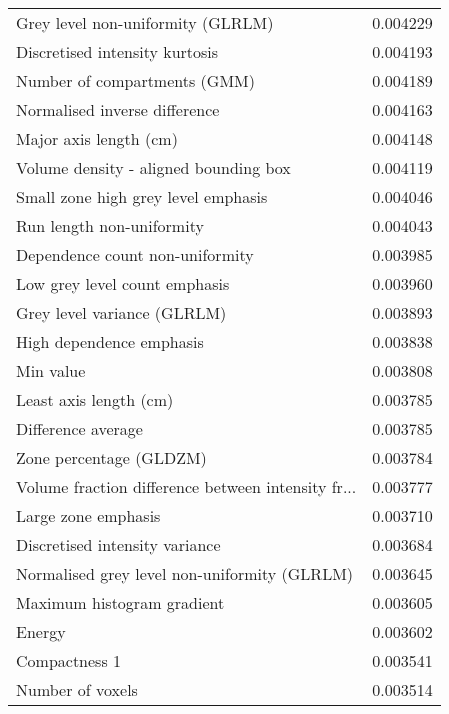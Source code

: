 \begin{longtable}{|lr|}
Grey level non-uniformity (GLRLM)                  &        0.004229 \\
Discretised intensity kurtosis                     &        0.004193 \\
Number of compartments (GMM)                       &        0.004189 \\
Normalised inverse difference                      &        0.004163 \\
Major axis length (cm)                             &        0.004148 \\
Volume density - aligned bounding box              &        0.004119 \\
Small zone high grey level emphasis                &        0.004046 \\
Run length non-uniformity                          &        0.004043 \\
Dependence count non-uniformity                    &        0.003985 \\
Low grey level count emphasis                      &        0.003960 \\
Grey level variance (GLRLM)                        &        0.003893 \\
High dependence emphasis                           &        0.003838 \\
Min value                                          &        0.003808 \\
Least axis length (cm)                             &        0.003785 \\
Difference average                                 &        0.003785 \\
Zone percentage (GLDZM)                            &        0.003784 \\
Volume fraction difference between intensity fr... &        0.003777 \\
Large zone emphasis                                &        0.003710 \\
Discretised intensity variance                     &        0.003684 \\
Normalised grey level non-uniformity (GLRLM)       &        0.003645 \\
Maximum histogram gradient                         &        0.003605 \\
Energy                                             &        0.003602 \\
Compactness 1                                      &        0.003541 \\
Number of voxels                                   &        0.003514 \\

\end{longtable}
